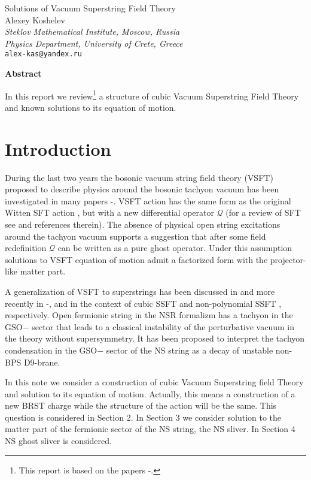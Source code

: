 \documentclass[a4paper,12pt]{article}
\begin{document}
\begin{center}
{\LARGE Solutions of Vacuum Superstring Field
Theory}\\
Alexey Koshelev\\
\textit{\small{Steklov Mathematical Institute, Moscow, Russia}}\\
\textit{\small{Physics Department, University of Crete, Greece}}\\
\texttt{\small{alex-kas@yandex.ru}}
\end{center}

\centerline{\textbf{Abstract}} 
In this report we
review\footnote{This report is based on the papers
\cite{ia_vssft}-\cite{ia_nsgs}.} a structure of cubic Vacuum
Superstring Field Theory and known solutions to its equation of
motion.
\section{Introduction}

During the last two years the bosonic vacuum string field theory (VSFT)
 proposed to describe physics around  the bosonic tachyon vacuum
  \cite{F2} has been  investigated in many papers
\cite{zwiebach}-\cite{Ohmori}.
VSFT action has the same form as
the original Witten SFT action \cite{Witten},
but with a new differential operator $\mathcal{Q}$ (for a review of
SFT see \cite{0102085,0109182,ABGKM} and references therein). The
absence of physical open string excitations around the tachyon
vacuum \cite{sen-con,Hata1}
supports a suggestion \cite{F2} that after some field
redefinition $\mathcal{Q}$ can be written as a pure ghost
operator.  Under this assumption
solutions to VSFT equation of motion
admit a  factorized form with the projector-like matter part.

A generalization of VSFT
to superstrings has been discussed in \cite{F2} and more recently in
\cite{ia_vssft}-\cite{ia_nsgs},\cite{Ohmori}
and \cite{Marino} in the context of cubic SSFT \cite{PTY,AMZ1} and
non-polynomial SSFT \cite{0002211},
respectively.
Open fermionic string in the NSR formalizm has a
tachyon in the GSO$-$ sector that leads to a classical instability of
the perturbative vacuum in the theory without supersymmetry. It
has been proposed  \cite{sen-con} to interpret the tachyon
condensation in the GSO$-$ sector of the NS string as a decay of unstable
non-BPS D9-brane.

In this note we consider a construction of cubic Vacuum Superstring field Theory
and solution to its equation of motion.
Actually, this means a construction of a new BRST charge while the structure of the action
will be the same. This question is considered in Section 2. In Section 3 we consider
solution to the matter part of the fermionic sector of the NS string, the NS sliver.
In Section 4 NS ghost sliver is considered.
\end{document}
